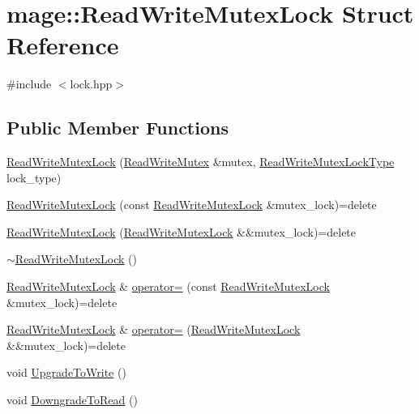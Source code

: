 \hypertarget{structmage_1_1_read_write_mutex_lock}{}\section{mage\+:\+:Read\+Write\+Mutex\+Lock Struct Reference}
\label{structmage_1_1_read_write_mutex_lock}


{\ttfamily \#include $<$lock.\+hpp$>$}

\subsection*{Public Member Functions}
\begin{DoxyCompactItemize}
\item 
\hyperlink{structmage_1_1_read_write_mutex_lock_a323e2f45646caa23c4ee21452c8f8d4a}{Read\+Write\+Mutex\+Lock} (\hyperlink{structmage_1_1_read_write_mutex}{Read\+Write\+Mutex} \&mutex, \hyperlink{namespacemage_afd76fcca37ce5c5b2227671290973c74}{Read\+Write\+Mutex\+Lock\+Type} lock\+\_\+type)
\item 
\hyperlink{structmage_1_1_read_write_mutex_lock_a2c9cd6329bfd18c4752235ebee7edb4a}{Read\+Write\+Mutex\+Lock} (const \hyperlink{structmage_1_1_read_write_mutex_lock}{Read\+Write\+Mutex\+Lock} \&mutex\+\_\+lock)=delete
\item 
\hyperlink{structmage_1_1_read_write_mutex_lock_ac1da0fa4a15d3dcae7a15ac3a8dcc8f9}{Read\+Write\+Mutex\+Lock} (\hyperlink{structmage_1_1_read_write_mutex_lock}{Read\+Write\+Mutex\+Lock} \&\&mutex\+\_\+lock)=delete
\item 
\hyperlink{structmage_1_1_read_write_mutex_lock_a64b600234d29ba7307fcd77a17486582}{$\sim$\+Read\+Write\+Mutex\+Lock} ()
\item 
\hyperlink{structmage_1_1_read_write_mutex_lock}{Read\+Write\+Mutex\+Lock} \& \hyperlink{structmage_1_1_read_write_mutex_lock_ade82a57f337e39a1515f67fbc1f6fc43}{operator=} (const \hyperlink{structmage_1_1_read_write_mutex_lock}{Read\+Write\+Mutex\+Lock} \&mutex\+\_\+lock)=delete
\item 
\hyperlink{structmage_1_1_read_write_mutex_lock}{Read\+Write\+Mutex\+Lock} \& \hyperlink{structmage_1_1_read_write_mutex_lock_a0c31334330a9259b0b68d71b9ee13704}{operator=} (\hyperlink{structmage_1_1_read_write_mutex_lock}{Read\+Write\+Mutex\+Lock} \&\&mutex\+\_\+lock)=delete
\item 
void \hyperlink{structmage_1_1_read_write_mutex_lock_a01843784e8dbf0d3dfd6100562f699be}{Upgrade\+To\+Write} ()
\item 
void \hyperlink{structmage_1_1_read_write_mutex_lock_ad3292e579d09107c7361989657b9bade}{Downgrade\+To\+Read} ()
\end{DoxyCompactItemize}
